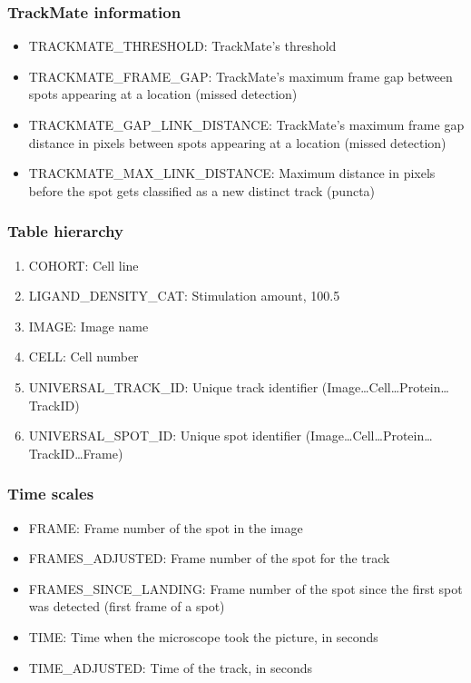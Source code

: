 \subsubsection{TrackMate information}
\begin{itemize}
\item TRACKMATE\_THRESHOLD: TrackMate's threshold
\item TRACKMATE\_FRAME\_GAP: TrackMate's maximum frame gap between spots appearing at a location (missed detection)
\item TRACKMATE\_GAP\_LINK\_DISTANCE: TrackMate's maximum frame gap distance in pixels between spots appearing at a location (missed detection)
\item TRACKMATE\_MAX\_LINK\_DISTANCE: Maximum distance in pixels before the spot gets classified as a new distinct track (puncta)
\end{itemize}

\subsubsection{Table hierarchy}
\begin{enumerate}
\item COHORT: Cell line
\item LIGAND\_DENSITY\_CAT: Stimulation amount, 100.5
\item IMAGE: Image name
\item CELL: Cell number
\item UNIVERSAL\_TRACK\_ID: Unique track identifier (Image…Cell…Protein…TrackID)
\item UNIVERSAL\_SPOT\_ID: Unique spot identifier (Image…Cell…Protein…TrackID…Frame)
\end{enumerate}
\subsubsection{Time scales}
\begin{itemize}
\item FRAME: Frame number of the spot in the image
\item FRAMES\_ADJUSTED: Frame number of the spot for the track
\item FRAMES\_SINCE\_LANDING: Frame number of the spot since the first spot was detected (first frame of a spot)
\item TIME: Time when the microscope took the picture, in seconds
\item TIME\_ADJUSTED: Time of the track, in seconds
\end{itemize}

